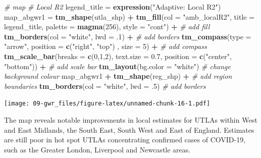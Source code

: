 \documentclass[
]{book}
\newenvironment{Shaded}{\begin{snugshade}}{\end{snugshade}}
\newcommand{\CommentTok}[1]{\textcolor[rgb]{0.56,0.35,0.01}{\textit{#1}}}
\newcommand{\DataTypeTok}[1]{\textcolor[rgb]{0.13,0.29,0.53}{#1}}
\newcommand{\DecValTok}[1]{\textcolor[rgb]{0.00,0.00,0.81}{#1}}
\newcommand{\FloatTok}[1]{\textcolor[rgb]{0.00,0.00,0.81}{#1}}
\newcommand{\KeywordTok}[1]{\textcolor[rgb]{0.13,0.29,0.53}{\textbf{#1}}}
\newcommand{\NormalTok}[1]{#1}
\newcommand{\OperatorTok}[1]{\textcolor[rgb]{0.81,0.36,0.00}{\textbf{#1}}}
\newcommand{\StringTok}[1]{\textcolor[rgb]{0.31,0.60,0.02}{#1}}
\begin{document}
\begin{Shaded}
\begin{Highlighting}[]
\CommentTok{# map}
  \CommentTok{# Local R2}
\NormalTok{legend_title =}\StringTok{ }\KeywordTok{expression}\NormalTok{(}\StringTok{"Adaptive: Local R2"}\NormalTok{)}
\NormalTok{map_abgwr1 =}\StringTok{ }\KeywordTok{tm_shape}\NormalTok{(utla_shp) }\OperatorTok{+}
\StringTok{  }\KeywordTok{tm_fill}\NormalTok{(}\DataTypeTok{col =} \StringTok{"amb_localR2"}\NormalTok{, }\DataTypeTok{title =}\NormalTok{ legend_title, }\DataTypeTok{palette =} \KeywordTok{magma}\NormalTok{(}\DecValTok{256}\NormalTok{), }\DataTypeTok{style =} \StringTok{"cont"}\NormalTok{) }\OperatorTok{+}\StringTok{ }\CommentTok{# add fill}
\StringTok{  }\KeywordTok{tm_borders}\NormalTok{(}\DataTypeTok{col =} \StringTok{"white"}\NormalTok{, }\DataTypeTok{lwd =} \FloatTok{.1}\NormalTok{)  }\OperatorTok{+}\StringTok{ }\CommentTok{# add borders}
\StringTok{  }\KeywordTok{tm_compass}\NormalTok{(}\DataTypeTok{type =} \StringTok{"arrow"}\NormalTok{, }\DataTypeTok{position =} \KeywordTok{c}\NormalTok{(}\StringTok{"right"}\NormalTok{, }\StringTok{"top"}\NormalTok{) , }\DataTypeTok{size =} \DecValTok{5}\NormalTok{) }\OperatorTok{+}\StringTok{ }\CommentTok{# add compass}
\StringTok{  }\KeywordTok{tm_scale_bar}\NormalTok{(}\DataTypeTok{breaks =} \KeywordTok{c}\NormalTok{(}\DecValTok{0}\NormalTok{,}\DecValTok{1}\NormalTok{,}\DecValTok{2}\NormalTok{), }\DataTypeTok{text.size =} \FloatTok{0.7}\NormalTok{, }\DataTypeTok{position =}  \KeywordTok{c}\NormalTok{(}\StringTok{"center"}\NormalTok{, }\StringTok{"bottom"}\NormalTok{)) }\OperatorTok{+}\StringTok{ }\CommentTok{# add scale bar}
\StringTok{  }\KeywordTok{tm_layout}\NormalTok{(}\DataTypeTok{bg.color =} \StringTok{"white"}\NormalTok{) }\CommentTok{# change background colour}
\NormalTok{map_abgwr1 }\OperatorTok{+}\StringTok{ }\KeywordTok{tm_shape}\NormalTok{(reg_shp) }\OperatorTok{+}\StringTok{ }\CommentTok{# add region boundaries}
\StringTok{  }\KeywordTok{tm_borders}\NormalTok{(}\DataTypeTok{col =} \StringTok{"white"}\NormalTok{, }\DataTypeTok{lwd =} \FloatTok{.5}\NormalTok{) }\CommentTok{# add borders}
\end{Highlighting}
\end{Shaded}

\texttt{[image: 09-gwr\_files/figure-latex/unnamed-chunk-16-1.pdf]}

The map reveals notable improvements in local estimates for UTLAs within West and East Midlands, the South East, South West and East of England. Estimates are still poor in hot spot UTLAs concentrating confirmed cases of COVID-19, such as the Greater London, Liverpool and Newcastle areas.
\end{document}
